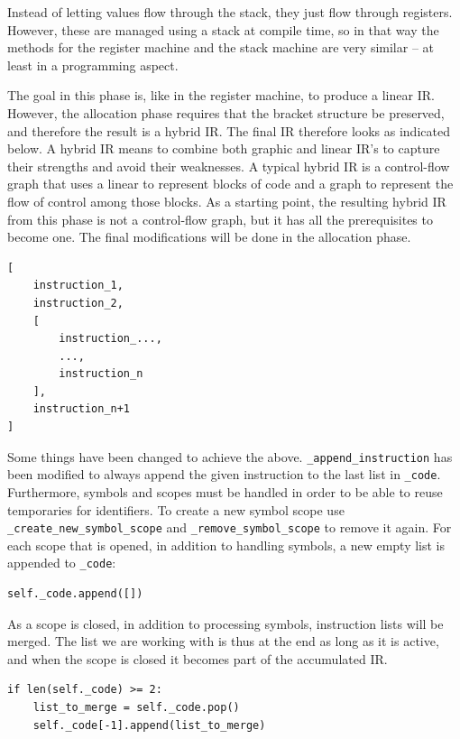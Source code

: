 Instead of letting values flow through the stack, they just flow through registers. However, these are managed using a stack at compile time, so in that way the methods for the register machine and the stack machine are very similar -- at least in a programming aspect.

The goal in this phase is, like in the register machine, to produce a linear IR. However, the allocation phase requires that the bracket structure be preserved, and therefore the result is a hybrid IR. The final IR therefore looks as indicated below. A hybrid IR means to combine both graphic and linear IR's to capture their strengths and avoid their weaknesses. A typical hybrid IR is a control-flow graph that uses a linear to represent blocks of code and a graph to represent the flow of control among those blocks. As a starting point, the resulting hybrid IR from this phase is not a control-flow graph, but it has all the prerequisites to become one. The final modifications will be done in the allocation phase.

\begin{verbatim}
[
    instruction_1,
    instruction_2,
    [
        instruction_...,
        ..., 
        instruction_n
    ],
    instruction_n+1
]
\end{verbatim}

Some things have been changed to achieve the above. \texttt{\_append\_instruction} has been modified to always append the given instruction to the last list in \texttt{\_code}. Furthermore, symbols and scopes must be handled in order to be able to reuse temporaries for identifiers. To create a new symbol scope use \texttt{\_create\_new\_symbol\_scope} and \texttt{\_remove\_symbol\_scope} to remove it again. For each scope that is opened, in addition to handling symbols, a new empty list is appended to \texttt{\_code}:

\begin{verbatim}
self._code.append([])
\end{verbatim}

As a scope is closed, in addition to processing symbols, instruction lists will be merged. The list we are working with is thus at the end as long as it is active, and when the scope is closed it becomes part of the accumulated IR.

\begin{verbatim}
if len(self._code) >= 2:
    list_to_merge = self._code.pop()
    self._code[-1].append(list_to_merge)
\end{verbatim}


